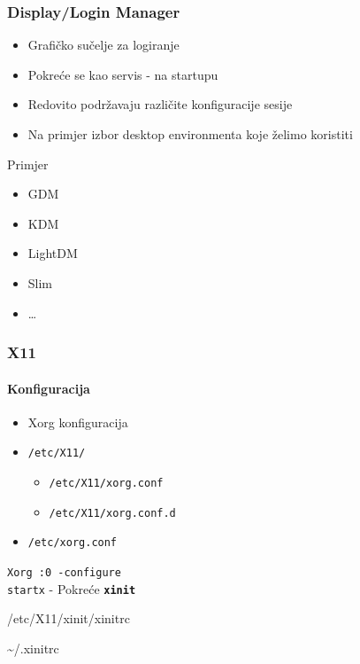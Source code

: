 \documentclass[t,table,usenames,dvipsnames]{beamer}
\begin{document}
\begin{frame}
	\frametitle{Display/Login Manager}
	\begin{itemize}
		\item Grafičko sučelje za logiranje
		\item Pokreće se kao servis - na startupu
		\item Redovito podržavaju različite konfiguracije sesije
		\item[] Na primjer izbor desktop environmenta koje želimo koristiti
	\end{itemize}
	\vfill
	Primjer
	\begin{itemize}
		\item GDM
		\item KDM
		\item LightDM
		\item Slim
		\item \ldots
	\end{itemize}
\end{frame}


\begin{frame}
	\frametitle{X11}
	\framesubtitle{Konfiguracija}
	\begin{itemize}
		\item Xorg konfiguracija
		\item[] \texttt{/etc/X11/}
		\begin{itemize}
			\item[] \texttt{/etc/X11/xorg.conf}
			\item[] \texttt{/etc/X11/xorg.conf.d}
		\end{itemize}
		\item[] \texttt{/etc/xorg.conf}
	\end{itemize}
	\vfill
	\texttt{Xorg :0 -configure}\\
	\texttt{startx} - Pokreće \texttt{\textbf{xinit}}
	\vfill
	\begin{itemize}
		{\ttfamily
			\item[] /etc/X11/xinit/xinitrc
			\item[] \textasciitilde/.xinitrc
		}
	\end{itemize}
\end{frame}
\end{document}

